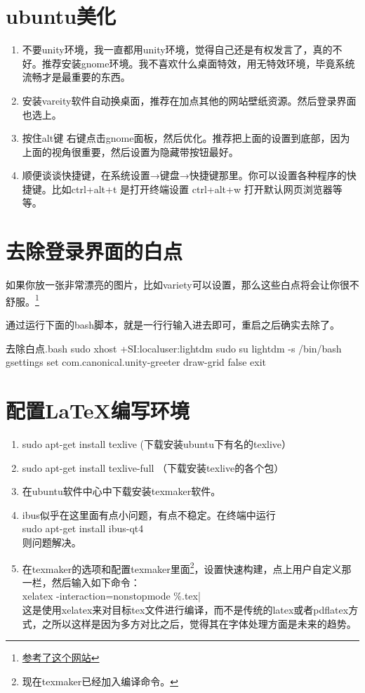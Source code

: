 \documentclass[11pt,oneside]{book}
\begin{document}
\begin{common-format}
\section{ubuntu美化}
\begin{enumerate}
\item 不要unity环境，我一直都用unity环境，觉得自己还是有权发言了，真的不好。推荐安装gnome环境。我不喜欢什么桌面特效，用无特效环境，毕竟系统流畅才是最重要的东西。
\item 安装vareity软件自动换桌面，推荐在加点其他的网站壁纸资源。然后登录界面也选上。
\item 按住alt键 右键点击gnome面板，然后优化。推荐把上面的设置到底部，因为上面的视角很重要，然后设置为隐藏带按钮最好。
\item 顺便谈谈快捷键，在系统设置→键盘→快捷键那里。你可以设置各种程序的快捷键。比如ctrl+alt+t 是打开终端设置 ctrl+alt+w 打开默认网页浏览器等等。
\end{enumerate}

\section{去除登录界面的白点}
如果你放一张非常漂亮的图片，比如variety可以设置，那么这些白点将会让你很不舒服。\footnote{\href{http://askubuntu.com/questions/72620/how-do-i-remove-the-dots-from-the-lightdm-greeter}{参考了这个网站}}

通过运行下面的bash脚本，就是一行行输入进去即可，重启之后确实去除了。
\begin{xverbatim}{去除白点.bash}
sudo xhost +SI:localuser:lightdm
sudo su lightdm -s /bin/bash
gsettings set com.canonical.unity-greeter draw-grid false
exit
\end{xverbatim}


\section{配置\LaTeX 编写环境}
\begin{enumerate}
\item sudo apt-get install texlive   (下载安装ubuntu下有名的texlive）
\item sudo apt-get install texlive-full   （下载安装texlive的各个包）
\item 在ubuntu软件中心中下载安装texmaker软件。
\item ibus似乎在这里面有点小问题，有点不稳定。在终端中运行\\sudo apt-get install ibus-qt4\\则问题解决。
\item 在texmaker的选项和配置texmaker里面\footnote{现在texmaker已经加入\XeLaTeX 编译命令。}，设置快速构建，点上用户自定义那一栏，然后输入如下命令：\\
xelatex -interaction=nonstopmode \%.tex| \\
这是使用xelatex来对目标tex文件进行编译，而不是传统的latex或者pdflatex方式，之所以这样是因为多方对比之后，觉得其在字体处理方面是未来的趋势。
\end{enumerate}



\end{common-format}
\end{document}
